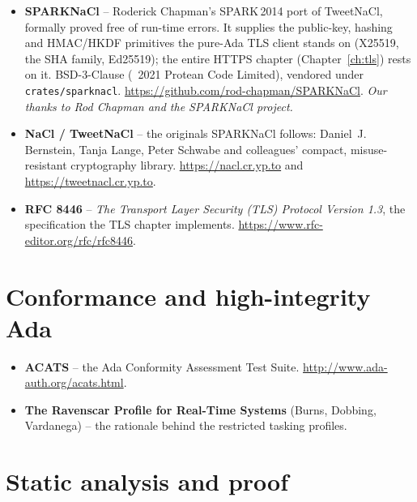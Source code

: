 \begin{itemize}
\item \textbf{SPARKNaCl} -- Roderick Chapman's SPARK\,2014 port of TweetNaCl,
  formally proved free of run-time errors. It supplies the public-key, hashing and
  HMAC/HKDF primitives the pure-Ada TLS client stands on (X25519, the SHA family,
  Ed25519); the entire HTTPS chapter (Chapter~\ref{ch:tls}) rests on it. BSD-3-Clause
  (\textcopyright~2021 Protean Code Limited), vendored under \texttt{crates/sparknacl}.
  \url{https://github.com/rod-chapman/SPARKNaCl}. \emph{Our thanks to Rod Chapman and
  the SPARKNaCl project.}
\item \textbf{NaCl / TweetNaCl} -- the originals SPARKNaCl follows: Daniel~J.
  Bernstein, Tanja Lange, Peter Schwabe and colleagues' compact, misuse-resistant
  cryptography library. \url{https://nacl.cr.yp.to} and
  \url{https://tweetnacl.cr.yp.to}.
\item \textbf{RFC 8446} -- \emph{The Transport Layer Security (TLS) Protocol Version
  1.3}, the specification the TLS chapter implements.
  \url{https://www.rfc-editor.org/rfc/rfc8446}.
\end{itemize}

\section{Conformance and high-integrity Ada}

\begin{itemize}
\item \textbf{ACATS} -- the Ada Conformity Assessment Test Suite.
  \url{http://www.ada-auth.org/acats.html}.
\item \textbf{The Ravenscar Profile for Real-Time Systems} (Burns, Dobbing,
  Vardanega) -- the rationale behind the restricted tasking profiles.
\end{itemize}

\section{Static analysis and proof}

